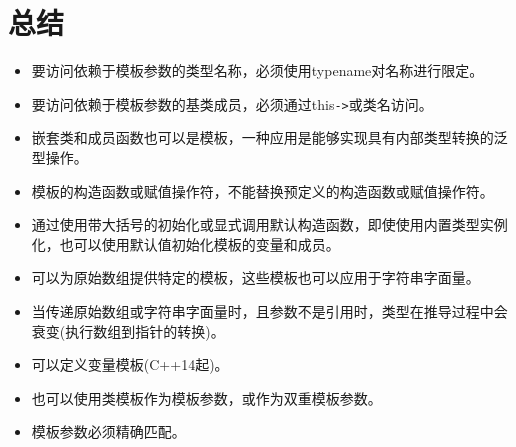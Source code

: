\section{总结}

\begin{itemize}
\item 
要访问依赖于模板参数的类型名称，必须使用typename对名称进行限定。

\item 
要访问依赖于模板参数的基类成员，必须通过this\texttt{->}或类名访问。

\item 
嵌套类和成员函数也可以是模板，一种应用是能够实现具有内部类型转换的泛型操作。

\item 
模板的构造函数或赋值操作符，不能替换预定义的构造函数或赋值操作符。

\item 
通过使用带大括号的初始化或显式调用默认构造函数，即使使用内置类型实例化，也可以使用默认值初始化模板的变量和成员。

\item 
可以为原始数组提供特定的模板，这些模板也可以应用于字符串字面量。

\item 
当传递原始数组或字符串字面量时，且参数不是引用时，类型在推导过程中会衰变(执行数组到指针的转换)。

\item 
可以定义变量模板(C++14起)。

\item 
也可以使用类模板作为模板参数，或作为双重模板参数。

\item 
模板参数必须精确匹配。
\end{itemize}